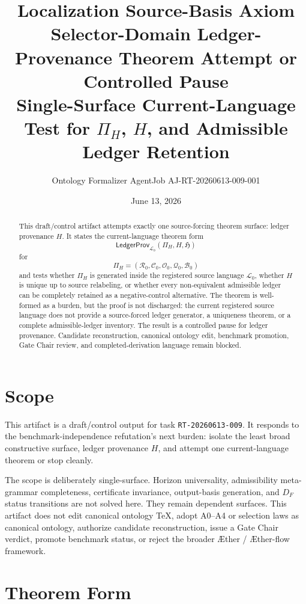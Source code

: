 \documentclass[11pt]{article}
\title{\textbf{Localization Source-Basis Axiom Selector-Domain Ledger-Provenance Theorem Attempt or Controlled Pause}\\[0.35em]
\large Single-Surface Current-Language Test for \(\Pi_H\), \(H\), and Admissible Ledger Retention}
\author{Ontology Formalizer AgentJob AJ-RT-20260613-009-001}
\date{June 13, 2026}
\newcommand{\Aether}{\AE{}ther}
\newcommand{\Aflow}{\AE{}ther-flow}
\newcommand{\TheoryProgram}{\Aether{} / \Aflow{} framework}
\newcommand{\Lang}{\mathcal{L}_{0}}
\newcommand{\LedgerFam}{\mathfrak{H}}
\newcommand{\LedgerProv}{\mathsf{LedgerProv}}
\begin{document}
\maketitle

\begin{abstract}
This draft/control artifact attempts exactly one source-forcing theorem
surface: ledger provenance \(H\). It states the current-language theorem
form
\[
\LedgerProv_{\Lang}(\Pi_H,H,\LedgerFam)
\]
for
\[
\Pi_H=(\mathcal{R}_{0},\mathcal{C}_{0},\mathcal{O}_{0},
\mathcal{Q}_{0},\mathcal{B}_{0})
\]
and tests whether \(\Pi_H\) is generated inside the registered source
language \(\Lang\), whether \(H\) is unique up to source relabeling, or
whether every non-equivalent admissible ledger can be completely retained as
a negative-control alternative. The theorem is well-formed as a burden, but
the proof is not discharged: the current registered source language does
not provide a source-forced ledger generator, a uniqueness theorem, or a
complete admissible-ledger inventory. The result is a controlled pause for
ledger provenance. Candidate reconstruction, canonical ontology edit,
benchmark promotion, Gate Chair review, and completed-derivation language
remain blocked.
\end{abstract}

\section{Scope}

This artifact is a draft/control output for task \texttt{RT-20260613-009}.
It responds to the benchmark-independence refutation's next burden: isolate
the least broad constructive surface, ledger provenance \(H\), and attempt
one current-language theorem or stop cleanly.

The scope is deliberately single-surface. Horizon universality,
admissibility meta-grammar completeness, certificate invariance,
output-basis generation, and \(D_F\) status transitions are not solved here.
They remain dependent surfaces. This artifact does not edit canonical
ontology TeX, adopt A0--A4 or selection laws as canonical ontology,
authorize candidate reconstruction, issue a Gate Chair verdict, promote
benchmark status, or reject the broader \TheoryProgram{}.

\section{Theorem Form}
\end{document}
